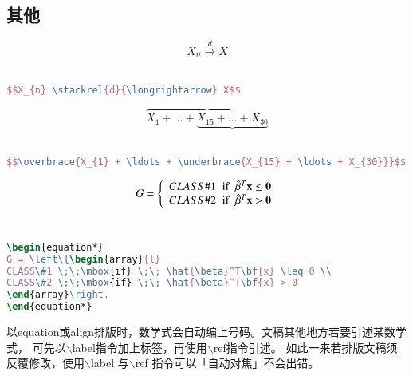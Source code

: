 \subsection{其他}

$$X_{n} \stackrel{d}{\longrightarrow} X$$\\
\begin{lstlisting}[language=TeX,numbers=none,frame=lrtb,keywords={begin}]
$$X_{n} \stackrel{d}{\longrightarrow} X$$
\end{lstlisting}

$$\overbrace{X_{1} + \ldots + \underbrace{X_{15} + \ldots + X_{30}}}$$\\
\begin{lstlisting}[language=TeX,numbers=none,frame=lrtb,keywords={begin}]
$$\overbrace{X_{1} + \ldots + \underbrace{X_{15} + \ldots + X_{30}}}$$
\end{lstlisting}

\begin{equation*}
G = \left\{\begin{array}{l}
CLASS\#1 \;\;\mbox{if} \;\; \hat{\beta}^T\bf{x} \leq 0 \\
CLASS\#2 \;\;\mbox{if} \;\; \hat{\beta}^T\bf{x} > 0
\end{array}\right.
\end{equation*}\\
\begin{lstlisting}[language=TeX,numbers=none,frame=lrtb,keywords={begin}]
\begin{equation*}
G = \left\{\begin{array}{l}
CLASS\#1 \;\;\mbox{if} \;\; \hat{\beta}^T\bf{x} \leq 0 \\
CLASS\#2 \;\;\mbox{if} \;\; \hat{\beta}^T\bf{x} > 0
\end{array}\right.
\end{equation*}
\end{lstlisting}

以equation或align排版时，数学式会自动编上号码。文稿其他地方若要引述某数学式，
可先以$\backslash$label指令加上标签，再使用$\backslash$ref指令引述。
如此一来若排版文稿须反覆修改，使用$\backslash$label 与$\backslash$ref 指令可以「自动对焦」不会出错。


